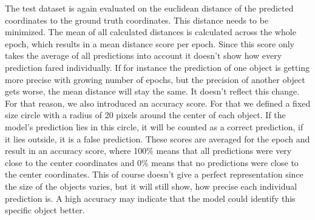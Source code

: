 The test dataset is again evaluated on the euclidean distance of the predicted coordinates to the ground truth coordinates.
This distance needs to be minimized.
The mean of all calculated distances is calculated across the whole epoch, which results in a mean distance score per epoch.
Since this score only takes the average of all predictions into account it doesn't show how every prediction fared individually.
If for instance the prediction of one object is getting more precise with growing number of epochs, but the precision of another object gets worse, the mean distance will stay the same.
It doesn't reflect this change.
For that reason, we also introduced an accuracy score.
For that we defined a fixed size circle with a radius of 20 pixels around the center of each object.
If the model's prediction lies in this circle, it will be counted as a correct prediction, if it lies outside, it is a false prediction.
These scores are averaged for the epoch and result in an accuracy score, where 100\% means that all predictions were very close to the center coordinates and 0\% means that no predictions were close to the center coordinates.
This of course doesn't give a perfect representation since the size of the objects varies, but it will still show, how precise each individual prediction is.
A high accuracy may indicate that the model could identify this specific object better.


